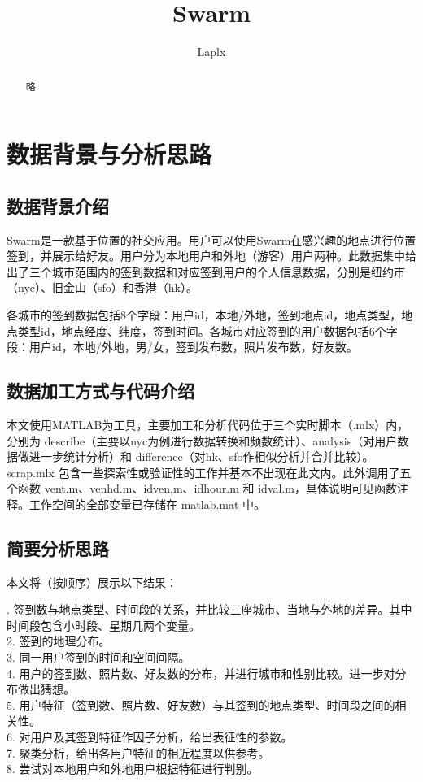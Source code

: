 \documentclass[UTF8]{ctexart}
\title{\huge{Swarm}}
\author{Laplx}
\date{}
\begin{document}
	\maketitle
	\begin{abstract}
		略
	\end{abstract}
	\tableofcontents
	
	\section{数据背景与分析思路}
		\subsection{数据背景介绍}
		Swarm是一款基于位置的社交应用。用户可以使用Swarm在感兴趣的地点进行位置签到，并展示给好友。用户分为本地用户和外地（游客）用户两种。此数据集中给出了三个城市范围内的签到数据和对应签到用户的个人信息数据，分别是纽约市（nyc）、旧金山（sfo）和香港（hk）。
		
		各城市的签到数据包括8个字段：用户id，本地/外地，签到地点id，地点类型，地点类型id，地点经度、纬度，签到时间。各城市对应签到的用户数据包括6个字段：用户id，本地/外地，男/女，签到发布数，照片发布数，好友数。
		\subsection{数据加工方式与代码介绍}
		本文使用MATLAB为工具，主要加工和分析代码位于三个实时脚本（.mlx）内，分别为 describe（主要以nyc为例进行数据转换和频数统计）、analysis（对用户数据做进一步统计分析）和 difference（对hk、sfo作相似分析并合并比较）。scrap.mlx 包含一些探索性或验证性的工作并基本不出现在此文内。此外调用了五个函数 vent.m、venhd.m、idven.m、idhour.m 和 idval.m，具体说明可见函数注释。工作空间的全部变量已存储在 matlab.mat 中。
		\subsection{简要分析思路}
		本文将（按顺序）展示以下结果：
		
		. 签到数与地点类型、时间段的关系，并比较三座城市、当地与外地的差异。其中时间段包含小时段、星期几两个变量。\\
		2. 签到的地理分布。\\
		3. 同一用户签到的时间和空间间隔。\\
		4. 用户的签到数、照片数、好友数的分布，并进行城市和性别比较。进一步对分布做出猜想。\\
		5. 用户特征（签到数、照片数、好友数）与其签到的地点类型、时间段之间的相关性。\\
		6. 对用户及其签到特征作因子分析，给出表征性的参数。\\
		7. 聚类分析，给出各用户特征的相近程度以供参考。\\
		8. 尝试对本地用户和外地用户根据特征进行判别。
	
\end{document}
